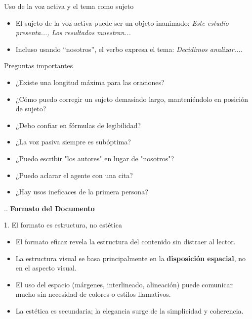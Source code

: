 \documentclass{beamer}
\begin{document}
\begin{frame}{Uso de la voz activa y el tema como sujeto}
\begin{itemize}
  \item El sujeto de la voz activa puede ser un objeto inanimado: \textit{Este estudio presenta..., Los resultados muestran...}
  \item Incluso usando “nosotros”, el verbo expresa el tema: \textit{Decidimos analizar....}

\end{itemize}
\end{frame}

\begin{frame}{Preguntas importantes}
\begin{itemize}
  \item ¿Existe una longitud máxima para las oraciones?
  \item ¿Cómo puedo corregir un sujeto demasiado largo, manteniéndolo en posición de sujeto?
  \item ¿Debo confiar en fórmulas de legibilidad?
  \item ¿La voz pasiva siempre es subóptima?
   \item ¿Puedo escribir "los autores" en lugar de "nosotros"?
   \item ¿Puedo aclarar el agente con una cita?
   \item ¿Hay usos ineficaces de la primera persona?
\end{itemize}
\end{frame}





\begin{frame}{ .. }
\centering
\vspace{0.5cm} %
{\Huge \textbf{Formato del Documento}}
\end{frame}

\begin{frame}{1. El formato es estructura, no estética}
\begin{itemize}
    \item El formato eficaz revela la estructura del contenido sin distraer al lector.
    \item La estructura visual se basa principalmente en la \textbf{disposición espacial}, no en el aspecto visual.
    \item El uso del espacio (márgenes, interlineado, alineación) puede comunicar mucho sin necesidad de colores o estilos llamativos.
    \item La estética es secundaria; la elegancia surge de la simplicidad y coherencia.
\end{itemize}
\end{frame}
\end{document}
